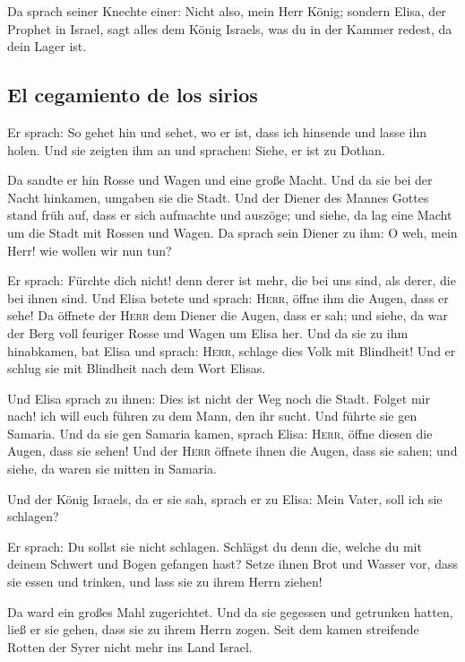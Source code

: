  Da sprach seiner Knechte einer: Nicht also, mein Herr
König; sondern Elisa, der Prophet in Israel, sagt alles dem König
Israels, was du in der Kammer redest, da dein Lager ist.

\hypertarget{el-cegamiento-de-los-sirios}{%
\subsection{El cegamiento de los
sirios}\label{el-cegamiento-de-los-sirios}}

 Er sprach: So gehet hin und sehet, wo er ist, dass ich
hinsende und lasse ihn holen. Und sie zeigten ihm an und sprachen:
Siehe, er ist zu Dothan.

 Da sandte er hin Rosse und Wagen und eine große Macht.
Und da sie bei der Nacht hinkamen, umgaben sie die Stadt.
 Und der Diener des Mannes Gottes stand früh auf, dass er
sich aufmachte und auszöge; und siehe, da lag eine Macht um die Stadt
mit Rossen und Wagen. Da sprach sein Diener zu ihm: O weh, mein Herr!
wie wollen wir nun tun?

 Er sprach: Fürchte dich nicht! denn derer ist mehr, die
bei uns sind, als derer, die bei ihnen sind.  Und Elisa
betete und sprach: \textsc{Herr}, öffne ihm die Augen, dass er sehe! Da
öffnete der \textsc{Herr} dem Diener die Augen, dass er sah; und siehe,
da war der Berg voll feuriger Rosse und Wagen um Elisa her.
 Und da sie zu ihm hinabkamen, bat Elisa und sprach:
\textsc{Herr}, schlage dies Volk mit Blindheit! Und er schlug sie mit
Blindheit nach dem Wort Elisas.

 Und Elisa sprach zu ihnen: Dies ist nicht der Weg noch
die Stadt. Folget mir nach! ich will euch führen zu dem Mann, den ihr
sucht. Und führte sie gen Samaria.  Und da sie gen
Samaria kamen, sprach Elisa: \textsc{Herr}, öffne diesen die Augen, dass
sie sehen! Und der \textsc{Herr} öffnete ihnen die Augen, dass sie
sahen; und siehe, da waren sie mitten in Samaria.

 Und der König Israels, da er sie sah, sprach er zu
Elisa: Mein Vater, soll ich sie schlagen?

 Er sprach: Du sollst sie nicht schlagen. Schlägst du
denn die, welche du mit deinem Schwert und Bogen gefangen hast? Setze
ihnen Brot und Wasser vor, dass sie essen und trinken, und lass sie zu
ihrem Herrn ziehen!

 Da ward ein großes Mahl zugerichtet. Und da sie gegessen
und getrunken hatten, ließ er sie gehen, dass sie zu ihrem Herrn zogen.
Seit dem kamen streifende Rotten der Syrer nicht mehr ins Land Israel.

